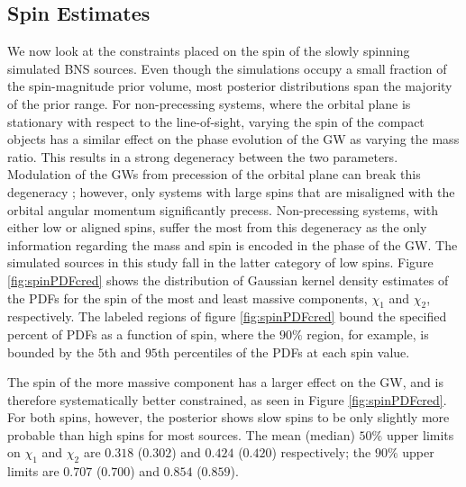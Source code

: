 \subsection{Spin Estimates}\label{sec:spin-magnitudes}
We now look at the constraints placed on the spin of the slowly spinning simulated BNS sources.  Even though the simulations occupy a small fraction of the spin-magnitude prior volume, most posterior distributions span the majority of the prior range. For non-precessing systems, where the orbital plane is stationary with respect to the line-of-sight, varying the spin of the compact objects has a similar effect on the phase evolution of the GW as varying the mass ratio. This results in a strong degeneracy between the two parameters.  Modulation of the GWs from precession of the orbital plane can break this degeneracy \citep{Vecchio_2004,Lang_2006,Vitale_2014,Chatziioannou_2014}; however, only systems with large spins that are misaligned with the orbital angular momentum significantly precess. Non-precessing systems, with either low or aligned spins, suffer the most from this degeneracy as the only information regarding the mass and spin is encoded in the phase of the GW.  The simulated sources in this study fall in the latter category of low spins.  Figure  \ref{fig:spinPDFcred} shows the distribution of Gaussian kernel density estimates of the PDFs for the spin of the most and least massive components, $\chi_1$ and $\chi_2$, respectively.  The labeled regions of figure \ref{fig:spinPDFcred} bound the specified percent of PDFs as a function of spin, where the $90\%$ region, for example, is bounded by the $5$th and $95$th percentiles of the PDFs at each spin value. 

The spin of the more massive component has a larger effect on the GW, and is therefore systematically better constrained, as seen in Figure \ref{fig:spinPDFcred}.  For both spins, however, the posterior shows slow spins to be only slightly more probable than high spins for most sources. The mean (median) $50\%$ upper limits on $\chi_1$ and $\chi_2$ are $0.318$ ($0.302$) and $0.424$ ($0.420$) respectively; the $90\%$ upper limits are $0.707$ ($0.700$) and $0.854$ ($0.859$).
  
  
  
  
  
  
  
  
  
  
  